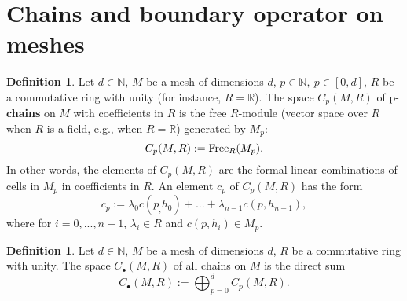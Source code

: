\documentclass[fleqn]{article}
\theoremstyle{definition}
\newtheorem{definition}[theorem]{Definition}
\begin{document}
\section{Chains and boundary operator on meshes}

\begin{definition}
  Let
    $d \in \mathbb{N}$,
    $M$ be a mesh of dimensions $d$,
    $p \in \mathbb{N},\ p \in [0, d]$,
    $R$ be a commutative ring with unity (for instance, $R = \mathbb{R}$).
  The space $C_p(M, R)$ of p-\textbf{chains} on $M$ with coefficients in $R$
  is the free $R$-module
  (vector space over $R$ when $R$ is a field, e.g., when $R = \mathbb{R}$)
  generated by $M_p$:
  \begin{equation}
    C_p(M, R) := {\rm Free}_R(M_p).
  \end{equation}
  In other words, the elements of $C_p(M, R)$ are the formal linear combinations
  of cells in $M_p$ in coefficients in $R$.
  An element $c_p$ of $C_p(M, R)$ has the form
  \begin{equation}
    c_p := \lambda_0 c(p_, h_0) + ... + \lambda_{n - 1} c(p, h_{n - 1}),
  \end{equation}
  where for $i = 0, ..., n - 1$, $\lambda_i \in R$ and $c(p, h_i) \in M_p$.
\end{definition}

\begin{definition}
  Let
    $d \in \mathbb{N}$,
    $M$ be a mesh of dimensions $d$,
    $R$ be a commutative ring with unity.
  The space $C_\bullet(M, R)$ of all chains on $M$ is the direct sum
  \begin{equation}
    C_\bullet(M, R) := \bigoplus_{p = 0}^d C_p(M, R).
  \end{equation}
\end{definition}
\end{document}
